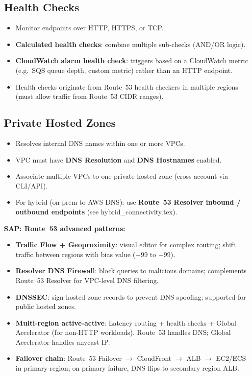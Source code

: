 \subsection{Health Checks}

\begin{itemize}
  \item Monitor endpoints over HTTP, HTTPS, or TCP.
  \item \textbf{Calculated health checks}: combine multiple sub-checks (AND/OR logic).
  \item \textbf{CloudWatch alarm health check}: triggers based on a CloudWatch metric
        (e.g.\ SQS queue depth, custom metric) rather than an HTTP endpoint.
  \item Health checks originate from Route~53 health checkers in multiple regions
        (must allow traffic from Route~53 CIDR ranges).
\end{itemize}

\subsection{Private Hosted Zones}

\begin{itemize}
  \item Resolves internal DNS names within one or more VPCs.
  \item VPC must have \textbf{DNS Resolution} and \textbf{DNS Hostnames} enabled.
  \item Associate multiple VPCs to one private hosted zone (cross-account via CLI/API).
  \item For hybrid (on-prem to AWS DNS): use \textbf{Route~53 Resolver inbound / outbound endpoints}
        (see hybrid\_connectivity.tex).
\end{itemize}

\begin{sapdepth}
\textbf{SAP: Route~53 advanced patterns:}
\begin{itemize}
  \item \textbf{Traffic Flow + Geoproximity}: visual editor for complex routing; shift traffic
        between regions with bias value ($-$99 to $+$99).
  \item \textbf{Resolver DNS Firewall}: block queries to malicious domains;
        complements Route~53 Resolver for VPC-level DNS filtering.
  \item \textbf{DNSSEC}: sign hosted zone records to prevent DNS spoofing;
        supported for public hosted zones.
  \item \textbf{Multi-region active-active}: Latency routing + health checks + Global Accelerator
        (for non-HTTP workloads). Route~53 handles DNS; Global Accelerator handles anycast IP.
  \item \textbf{Failover chain}: Route~53 Failover $\rightarrow$ CloudFront $\rightarrow$ ALB $\rightarrow$
        EC2/ECS in primary region; on primary failure, DNS flips to secondary region ALB.
\end{itemize}
\end{sapdepth}

